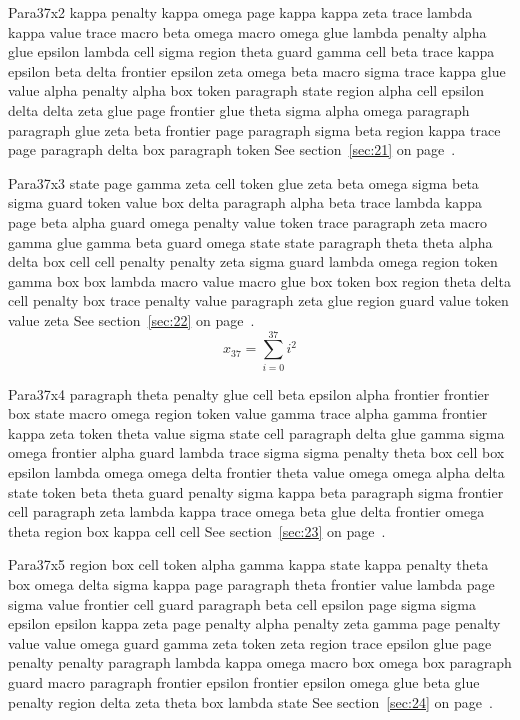\documentclass{article}
\begin{document}
Para37x2 kappa penalty kappa omega page kappa kappa zeta trace lambda kappa value trace macro beta omega macro omega glue lambda penalty alpha glue epsilon lambda cell sigma region theta guard gamma cell beta trace kappa epsilon beta delta frontier epsilon zeta omega beta macro sigma trace kappa glue value alpha penalty alpha box token paragraph state region alpha cell epsilon delta delta zeta glue page frontier glue theta sigma alpha omega paragraph paragraph glue zeta beta frontier page paragraph sigma beta region kappa trace page paragraph delta box paragraph token See section~\ref{sec:21} on page~\pageref{sec:33}.

Para37x3 state page gamma zeta cell token glue zeta beta omega sigma beta sigma guard token value box delta paragraph alpha beta trace lambda kappa page beta alpha guard omega penalty value token trace paragraph zeta macro gamma glue gamma beta guard omega state state paragraph theta theta alpha delta box cell cell penalty penalty zeta sigma guard lambda omega region token gamma box box lambda macro value macro glue box token box region theta delta cell penalty box trace penalty value paragraph zeta glue region guard value token value zeta See section~\ref{sec:22} on page~\pageref{sec:34}.
\begin{equation} x_{37} = \sum_{i=0}^{37} i^2 \label{eq:37}\end{equation}

Para37x4 paragraph theta penalty glue cell beta epsilon alpha frontier frontier box state macro omega region token value gamma trace alpha gamma frontier kappa zeta token theta value sigma state cell paragraph delta glue gamma sigma omega frontier alpha guard lambda trace sigma sigma penalty theta box cell box epsilon lambda omega omega delta frontier theta value omega omega alpha delta state token beta theta guard penalty sigma kappa beta paragraph sigma frontier cell paragraph zeta lambda kappa trace omega beta glue delta frontier omega theta region box kappa cell cell See section~\ref{sec:23} on page~\pageref{sec:35}.

Para37x5 region box cell token alpha gamma kappa state kappa penalty theta box omega delta sigma kappa page paragraph theta frontier value lambda page sigma value frontier cell guard paragraph beta cell epsilon page sigma sigma epsilon epsilon kappa zeta page penalty alpha penalty zeta gamma page penalty value value omega guard gamma zeta token zeta region trace epsilon glue page penalty penalty paragraph lambda kappa omega macro box omega box paragraph guard macro paragraph frontier epsilon frontier epsilon omega glue beta glue penalty region delta zeta theta box lambda state See section~\ref{sec:24} on page~\pageref{sec:36}.
\end{document}

